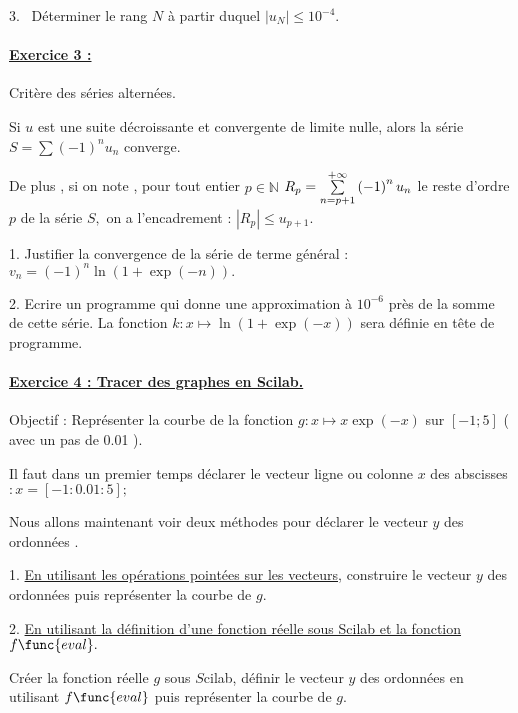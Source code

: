 \documentclass{article}
\begin{document}
3. \ D\'{e}terminer le rang $N$ \`{a} partir duquel $\left\vert
u_{N}\right\vert \leq 10^{-4}.$

\paragraph{\protect\underline{Exercice 3 :}}

Crit\`{e}re des s\'{e}ries altern\'{e}es.

Si $u$ est une suite d\'{e}croissante et convergente de limite nulle, alors
la s\'{e}rie $S=\sum \left( -1\right) ^{n}u_{n}$ converge.

De plus , si on note , pour tout entier $p\in \mathbb{N}$ $R_{p}=\underset{%
n=p+1}{\overset{+\infty }{\sum }}\left( -1\right) ^{n}u_{n}$ le reste
d'ordre $p$ de la s\'{e}rie $S,$ on a l'encadrement : $\left\vert
R_{p}\right\vert \leq u_{p+1}.$

1. Justifier la convergence de la s\'{e}rie de terme g\'{e}n\'{e}ral : $%
v_{n}=\left( -1\right) ^{n}\ln (1+\exp (-n)).$

2. Ecrire un programme qui donne une approximation \`{a} $10^{-6}$ pr\`{e}s
de la somme de cette s\'{e}rie. La fonction $k:x\mapsto \ln (1+\exp (-x))$
sera d\'{e}finie en t\^{e}te de programme.

\bigskip

\paragraph{\protect\underline{Exercice 4 : Tracer des graphes en Scilab.}}

Objectif : Repr\'{e}senter la courbe de la fonction $g:x\mapsto x\exp (-x)$
sur $\left[ -1;5\right] $ ( avec un pas de 0.01 ).

Il faut dans un premier temps d\'{e}clarer le vecteur ligne ou colonne $x$
des abscisses$:x=\left[ -1:0.01:5\right] ;$

Nous allons maintenant voir deux m\'{e}thodes pour d\'{e}clarer le vecteur $%
y $ des ordonn\'{e}es .

1. \underline{En utilisant les op\'{e}rations point\'{e}es sur les vecteurs,}
construire le vecteur $y$ des ordonn\'{e}es puis repr\'{e}senter la courbe
de $g.$

2. \underline{En utilisant la d\'{e}finition d'une fonction r\'{e}elle sous
Scilab et la fonction $f\func{eval}.$}

Cr\'{e}er la fonction r\'{e}elle $g$ sous $S$cilab, d\'{e}finir le vecteur $%
y $ des ordonn\'{e}es en utilisant $f\func{eval}$ puis repr\'{e}senter la
courbe de $g.$
\end{document}
